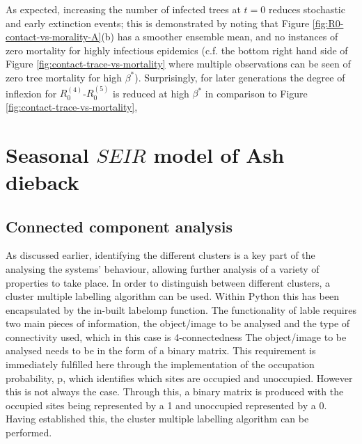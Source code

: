 As expected, increasing the number of infected trees at $t=0$ reduces stochastic and early extinction events;
this is demonstrated by noting that Figure \ref{fig:R0-contact-vs-morality-A}(b) has a smoother ensemble mean, and no instances of zero mortality for highly infectious epidemics (c.f. the bottom right hand side of Figure \ref{fig:contact-trace-vs-mortality} where multiple observations can be seen of zero tree mortality for high $\beta^*$).
Surprisingly, for later generations the degree of inflexion for $R_0^{(4)}$-$R_0^{(5)}$ is reduced at high $\beta^*$ in comparison to Figure \ref{fig:contact-trace-vs-mortality},

\newpage


\chapter{Seasonal $SEIR$ model of Ash dieback}

\label{section:ga-SEIR-variant}

\section{Connected component analysis}
\label{a:CCA}

As discussed earlier, identifying the different clusters is a key part of the analysing the systems’ behaviour, 
allowing further analysis of a variety of properties to take place. 
In order to distinguish between different clusters, a cluster multiple labelling algorithm can be used. 
Within Python this has been encapsulated by the in-built labelomp function. 
The functionality of lable requires two main pieces of information, the object/image to be analysed and the type of connectivity used, which in this case is 4-connectedness
The object/image to be analysed needs to be in the form of a binary matrix. 
This requirement is immediately fulfilled here through the implementation of the occupation probability, p, which identifies which sites are occupied and unoccupied.
However this is not always the case. 
Through this, a binary matrix is produced with the occupied sites being represented by a 1 and unoccupied represented by a 0. 
Having established this, the cluster multiple labelling algorithm can be performed.

